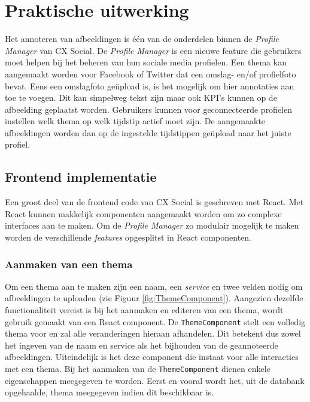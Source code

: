 
\chapter{Praktische uitwerking}
\vspace{-3cm}
Het annoteren van afbeeldingen is \'{e}\'{e}n van de onderdelen binnen de \textit{Profile Manager} van CX Social. De \textit{Profile Manager} is een nieuwe feature die gebruikers moet helpen bij het beheren van hun sociale media profielen. Een thema kan aangemaakt worden voor Facebook of Twitter dat een omslag- en/of profielfoto bevat. Eens een omslagfoto ge\"{u}pload is, is het mogelijk om hier annotaties aan toe te voegen. Dit kan simpelweg tekst zijn maar ook KPI's kunnen op de afbeelding geplaatst worden. Gebruikers kunnen voor geconnecteerde profielen instellen welk thema op welk tijdstip actief moet zijn. De aangemaakte afbeeldingen worden dan op de ingestelde tijdstippen ge\"{u}pload naar het juiste profiel. 


\section{Frontend implementatie}
Een groot deel van de frontend code van CX Social is geschreven met React. Met React kunnen makkelijk componenten aangemaakt worden om zo complexe interfaces aan te maken. Om de \textit{Profile Manager} zo modulair mogelijk te maken worden de verschillende \textit{features} opgesplitst in React componenten. 

\subsection{Aanmaken van een thema} \label{AanmakenVanEenThema}

Om een thema aan te maken zijn een naam, een \textit{service} %
en twee velden nodig om afbeeldingen te uploaden (zie Figuur \ref{fig:ThemeComponent}). Aangezien dezelfde functionaliteit vereist is bij het aanmaken en editeren van een thema, wordt gebruik gemaakt van een React component. De \texttt{ThemeComponent} stelt een volledig thema voor en zal alle veranderingen hieraan afhandelen. Dit betekent dus zowel het ingeven van de naam en service als het bijhouden van de geannoteerde afbeeldingen. Uiteindelijk is het deze component die instaat voor alle interacties met een thema. 
Bij het aanmaken van de \texttt{ThemeComponent} dienen enkele eigenschappen meegegeven te worden. Eerst en vooral wordt het, uit de databank opgehaalde, thema meegegeven indien dit beschikbaar is. %

